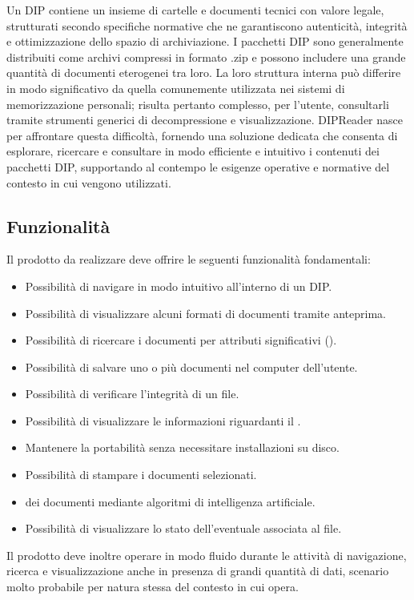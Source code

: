 \noindent Un DIP contiene un insieme di cartelle e documenti tecnici con valore legale, strutturati secondo specifiche normative che ne garantiscono autenticità, integrità e ottimizzazione dello spazio di archiviazione.
I pacchetti DIP sono generalmente distribuiti come archivi compressi in formato .zip e possono includere una grande quantità di documenti eterogenei tra loro.
La loro struttura interna può differire in modo significativo da quella comunemente utilizzata nei sistemi di memorizzazione personali; risulta pertanto complesso, per l'utente, consultarli tramite strumenti generici di decompressione e visualizzazione.
DIPReader nasce per affrontare questa difficoltà, fornendo una soluzione dedicata che consenta di esplorare, ricercare e consultare in modo efficiente e intuitivo i contenuti dei pacchetti DIP, supportando al contempo le esigenze operative e normative del contesto in cui vengono utilizzati.

\subsection{Funzionalità}
Il prodotto da realizzare deve offrire le seguenti funzionalità fondamentali:
\begin{itemize}
    \item Possibilità di navigare in modo intuitivo all'interno di un DIP.
    \item Possibilità di visualizzare alcuni formati di documenti tramite anteprima.
    \item Possibilità di ricercare i documenti per attributi significativi ().
    \item Possibilità di salvare uno o più documenti nel computer dell'utente.
    \item Possibilità di verificare l'integrità di un file.
    \item Possibilità di visualizzare le informazioni riguardanti il .
    \item Mantenere la portabilità senza necessitare installazioni su disco.
    \item Possibilità di stampare i documenti selezionati.
    \item {} dei documenti mediante algoritmi di intelligenza artificiale.
    \item Possibilità di visualizzare lo stato dell'eventuale  associata al file.
\end{itemize}
Il prodotto deve inoltre operare in modo fluido durante le attività di navigazione, ricerca e visualizzazione anche in presenza di grandi quantità di dati, scenario molto probabile per natura stessa del contesto in cui opera.

